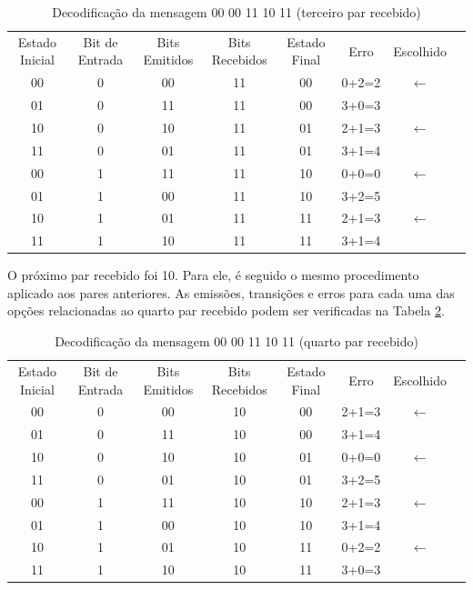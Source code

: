 \documentclass[12pt]{article}
\begin{document}
\begin{table}[!ht]
\centering
\caption{Decodificação da mensagem 00 00 11 10 11 (terceiro par recebido)}
\label{decodTable3}
\def\arraystretch{1.2}
\begin{tabular}{cccccccc}
\multirow{2}{3.6em}{Estado Inicial} & \multirow{2}{3.6em}{Bit de Entrada} &  \multirow{2}{3.6em}{Bits Emitidos} & \multirow{2}{3.6em}{Bits Recebidos} & \multirow{2}{3.6em}{Estado Final} & \multirow{2}{3.6em}{Erro} &
\multirow{2}{3.6em}{Escolhido}\\&&&&&&\\ \hline
 00 & 0 & 00 & 11 & 00 & 0+2=2 & $\longleftarrow$\\
 01 & 0 & 11 & 11 & 00 & 3+0=3 &\\
 10 & 0 & 10 & 11 & 01 & 2+1=3 & $\longleftarrow$\\
 11 & 0 & 01 & 11 & 01 & 3+1=4 &\\
 00 & 1 & 11 & 11 & 10 & 0+0=0 & $\longleftarrow$\\
 01 & 1 & 00 & 11 & 10 & 3+2=5 &\\
 10 & 1 & 01 & 11 & 11 & 2+1=3 & $\longleftarrow$\\
 11 & 1 & 10 & 11 & 11 & 3+1=4 &\\\hline
\end{tabular}
\end{table}

O próximo par recebido foi 10. Para ele, é seguido o mesmo procedimento aplicado aos pares anteriores. As emissões, transições e erros para cada uma das opções relacionadas ao quarto par recebido podem ser verificadas na Tabela \ref{decodTable4}.

\begin{table}[!ht]
\centering
\caption{Decodificação da mensagem 00 00 11 10 11 (quarto par recebido)}
\label{decodTable4}
\def\arraystretch{1.2}
\begin{tabular}{cccccccc}
\multirow{2}{3.6em}{Estado Inicial} & \multirow{2}{3.6em}{Bit de Entrada} &  \multirow{2}{3.6em}{Bits Emitidos} & \multirow{2}{3.6em}{Bits Recebidos} & \multirow{2}{3.6em}{Estado Final} & \multirow{2}{3.6em}{Erro} &
\multirow{2}{3.6em}{Escolhido}\\&&&&&&\\ \hline
 00 & 0 & 00 & 10 & 00 & 2+1=3 & $\longleftarrow$\\
 01 & 0 & 11 & 10 & 00 & 3+1=4 &\\
 10 & 0 & 10 & 10 & 01 & 0+0=0 & $\longleftarrow$\\
 11 & 0 & 01 & 10 & 01 & 3+2=5 &\\
 00 & 1 & 11 & 10 & 10 & 2+1=3 & $\longleftarrow$\\
 01 & 1 & 00 & 10 & 10 & 3+1=4 &\\
 10 & 1 & 01 & 10 & 11 & 0+2=2 & $\longleftarrow$\\
 11 & 1 & 10 & 10 & 11 & 3+0=3 &\\\hline
\end{tabular}
\end{table}
\end{document}
